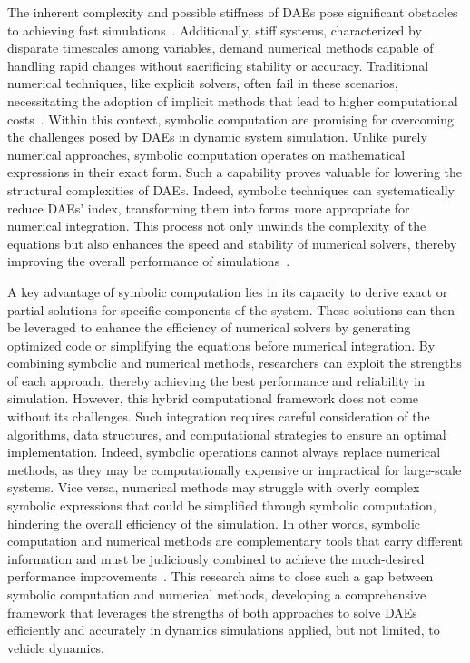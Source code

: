 The inherent complexity and possible stiffness of \acp{DAE} pose significant obstacles to achieving fast simulations~\cite{burger2018dae, blundell2004multibody, dejalon1994kinematic}. Additionally, stiff systems, characterized by disparate timescales among variables, demand numerical methods capable of handling rapid changes without sacrificing stability or accuracy. Traditional numerical techniques, like explicit solvers, often fail in these scenarios, necessitating the adoption of implicit methods that lead to higher computational costs~\cite{petzold1982differential, brenan1995numerical}. Within this context, symbolic computation are promising for overcoming the challenges posed by \acp{DAE} in dynamic system simulation. Unlike purely numerical approaches, symbolic computation operates on mathematical expressions in their exact form. Such a capability proves valuable for lowering the structural complexities of \acp{DAE}. Indeed, symbolic techniques can systematically reduce \acp{DAE}' index, transforming them into forms more appropriate for numerical integration. This process not only unwinds the complexity of the equations but also enhances the speed and stability of numerical solvers, thereby improving the overall performance of simulations~\cite{petzold1982differential, brenan1995numerical, griepentrog1986differential}.

A key advantage of symbolic computation lies in its capacity to derive exact or partial solutions for specific components of the system. These solutions can then be leveraged to enhance the efficiency of numerical solvers by generating optimized code or simplifying the equations before numerical integration. By combining symbolic and numerical methods, researchers can exploit the strengths of each approach, thereby achieving the best performance and reliability in simulation. However, this hybrid computational framework does not come without its challenges. Such integration requires careful consideration of the algorithms, data structures, and computational strategies to ensure an optimal implementation. Indeed, symbolic operations cannot always replace numerical methods, as they may be computationally expensive or impractical for large-scale systems. Vice versa, numerical methods may struggle with overly complex symbolic expressions that could be simplified through symbolic computation, hindering the overall efficiency of the simulation. In other words, symbolic computation and numerical methods are complementary tools that carry different information and must be judiciously combined to achieve the much-desired performance improvements~\cite{cohen2002computer, cohen2003computer}. This research aims to close such a gap between symbolic computation and numerical methods, developing a comprehensive framework that leverages the strengths of both approaches to solve \acp{DAE} efficiently and accurately in dynamics simulations applied, but not limited, to vehicle dynamics.

